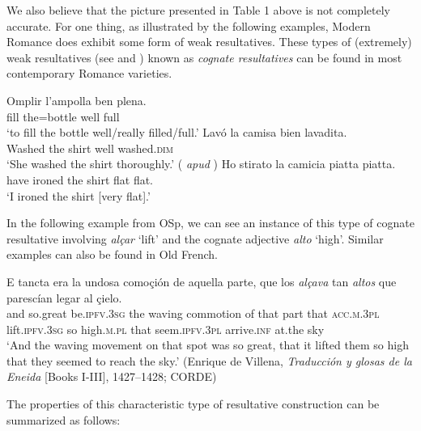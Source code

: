\documentclass[output=paper,colorlinks,citecolor=brown,
]{langscibook}
\begin{document}
We also believe that the picture presented in Table 1 above is not completely accurate. For one thing, as illustrated by the following examples, Modern Romance does exhibit some form of weak resultatives. These types of (extremely) weak resultatives (see \citealt{Whelpton2006} and \citealt{Mateu2012}) known as \textit{cognate resultatives} can be found in most contemporary Romance varieties. 

\ea
\settowidth{}
  \ea\label{ex:acedomatellan:omplir}
    \gll Omplir l'ampolla ben plena.\\
fill the=bottle well full\\
    \glt `to fill the bottle well/really filled/full.’ \citep{EspinalandMateu2018}
  \ex\label{ex:acedomatellan:lavadita}
    \gll Lavó la camisa bien lavadita.\\
Washed the shirt well washed.\textsc{dim} \\
    \glt `She washed the shirt thoroughly.’ (\citealt{Demonte1991} \textit{apud} \citealt{Armstrong2012})
  \ex
    \gll Ho stirato la camicia piatta piatta.\\ 
have ironed the shirt flat flat.\\
    \glt `I ironed the shirt [very flat].'  \citep{Napoli1992}
  \z 
\z 

\noindent In the following example from OSp, we can see an instance of this type of cognate resultative involving \textit{alçar} `lift' and the cognate adjective \textit{alto} `high'. Similar examples can also be found in Old French.

\ea\label{ex:acedomatellan:etancta}
  \gll E tancta era la undosa comoçión de aquella parte, que los \textit{alçava} tan \textit{altos} que parescían legar al çielo. \\
and so.great be.\textsc{ipfv}.\textsc{3sg} the waving commotion of that part that \textsc{acc}.\textsc{m}.\textsc{3pl} lift.\textsc{ipfv}.\textsc{3sg} so high.\textsc{m}.\textsc{pl} that seem.\textsc{ipfv}.\textsc{3pl} arrive.\textsc{inf} at.the sky\\
  \glt `And the waving movement on that spot was so great, that it lifted them so high that they seemed to reach the sky.' (Enrique de Villena, \textit{Traducción y glosas de la Eneida} [Books I-III], 1427--1428; CORDE)
\z 

The properties of this characteristic type of resultative construction can be summarized as follows:
\end{document}
